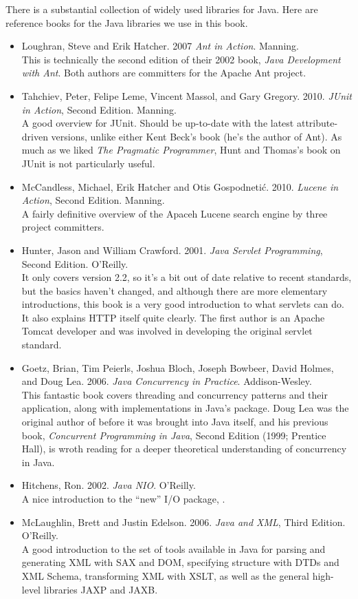 \noindent
There is a substantial collection of widely used libraries for Java.
Here are reference books for the Java libraries we use in this book.
%
\begin{itemize}
%
\item 
Loughran, Steve and Erik Hatcher. 2007
{\it Ant in Action}.  Manning.
\\
{\footnotesize This is technically the second edition of their 2002
book, {\it Java Development with Ant}.  Both authors are committers for
the Apache Ant project.}
%
\item
Tahchiev, Peter, Felipe Leme,
Vincent Massol, and Gary Gregory. 2010.
{\it JUnit in Action}, Second Edition.  Manning.
\\
{\footnotesize A good overview for JUnit.  Should be up-to-date with
the latest attribute-driven versions, unlike either Kent Beck's book
(he's the author of Ant).  As much as we liked {\it The Pragmatic
Programmer}, Hunt and Thomas's book on JUnit is not particularly useful.}
%
\item
McCandless, Michael, Erik Hatcher and Otis Gospodneti\'c.
2010.
{\it Lucene in Action}, Second Edition. Manning.
\\
{\footnotesize A fairly definitive overview of the Apaceh Lucene
search engine by three project committers.}
%
\item
Hunter, Jason and William Crawford. 2001. {\it Java Servlet Programming}, Second Edition. O'Reilly.
\\
{\footnotesize It only covers version 2.2, so it's a bit out of date
relative to recent standards, but the basics haven't changed, and
although there are more elementary introductions, this book is a very
good introduction to what servlets can do.  It also explains HTTP
itself quite clearly.  The first author is an Apache Tomcat developer
and was involved in developing the original servlet standard.}
%
\item
Goetz, Brian, Tim Peierls, Joshua Bloch, Joseph Bowbeer, David Holmes, and Doug Lea. 2006. {\it
Java Concurrency in Practice}.  Addison-Wesley.
\\
{\footnotesize This fantastic book covers threading and concurrency
patterns and their application, along with implementations in Java's
 package.  Doug Lea was the original author
of  before it was brought into Java itself, and
his previous book, {\it Concurrent Programming in Java}, Second
Edition (1999; Prentice Hall), is wroth reading for a deeper theoretical
understanding of concurrency in Java.}
%
\item
Hitchens, Ron. 2002.  {\it Java NIO}. O'Reilly.
\\
{\footnotesize A nice introduction to the ``new'' I/O package, .}
%
\item
McLaughlin, Brett and Justin Edelson. 2006. {\it Java and XML}, Third Edition. O'Reilly.
\\
{\footnotesize A good introduction to the set of tools available in
Java for parsing and generating XML with SAX and DOM, specifying structure
with DTDs and XML Schema, transforming XML with XSLT, as well as the general 
high-level libraries JAXP and JAXB.}
\end{itemize}

